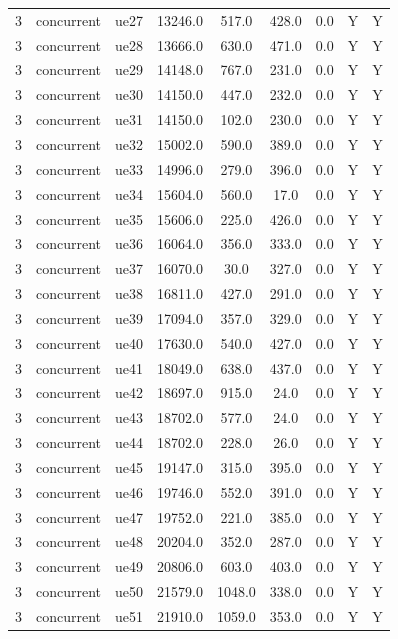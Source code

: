 \begin{table}[ht]
\begin{tabular}{|c|c|c|c|c|c|c|c|c|}
3 & concurrent & ue27 & 13246.0 & 517.0 & 428.0 & 0.0 & Y & Y \\
3 & concurrent & ue28 & 13666.0 & 630.0 & 471.0 & 0.0 & Y & Y \\
3 & concurrent & ue29 & 14148.0 & 767.0 & 231.0 & 0.0 & Y & Y \\
3 & concurrent & ue30 & 14150.0 & 447.0 & 232.0 & 0.0 & Y & Y \\
3 & concurrent & ue31 & 14150.0 & 102.0 & 230.0 & 0.0 & Y & Y \\
3 & concurrent & ue32 & 15002.0 & 590.0 & 389.0 & 0.0 & Y & Y \\
3 & concurrent & ue33 & 14996.0 & 279.0 & 396.0 & 0.0 & Y & Y \\
3 & concurrent & ue34 & 15604.0 & 560.0 & 17.0 & 0.0 & Y & Y \\
3 & concurrent & ue35 & 15606.0 & 225.0 & 426.0 & 0.0 & Y & Y \\
3 & concurrent & ue36 & 16064.0 & 356.0 & 333.0 & 0.0 & Y & Y \\
3 & concurrent & ue37 & 16070.0 & 30.0 & 327.0 & 0.0 & Y & Y \\
3 & concurrent & ue38 & 16811.0 & 427.0 & 291.0 & 0.0 & Y & Y \\
3 & concurrent & ue39 & 17094.0 & 357.0 & 329.0 & 0.0 & Y & Y \\
3 & concurrent & ue40 & 17630.0 & 540.0 & 427.0 & 0.0 & Y & Y \\
3 & concurrent & ue41 & 18049.0 & 638.0 & 437.0 & 0.0 & Y & Y \\
3 & concurrent & ue42 & 18697.0 & 915.0 & 24.0 & 0.0 & Y & Y \\
3 & concurrent & ue43 & 18702.0 & 577.0 & 24.0 & 0.0 & Y & Y \\
3 & concurrent & ue44 & 18702.0 & 228.0 & 26.0 & 0.0 & Y & Y \\
3 & concurrent & ue45 & 19147.0 & 315.0 & 395.0 & 0.0 & Y & Y \\
3 & concurrent & ue46 & 19746.0 & 552.0 & 391.0 & 0.0 & Y & Y \\
3 & concurrent & ue47 & 19752.0 & 221.0 & 385.0 & 0.0 & Y & Y \\
3 & concurrent & ue48 & 20204.0 & 352.0 & 287.0 & 0.0 & Y & Y \\
3 & concurrent & ue49 & 20806.0 & 603.0 & 403.0 & 0.0 & Y & Y \\
3 & concurrent & ue50 & 21579.0 & 1048.0 & 338.0 & 0.0 & Y & Y \\
3 & concurrent & ue51 & 21910.0 & 1059.0 & 353.0 & 0.0 & Y & Y \\

\end{tabular}
\end{table}
